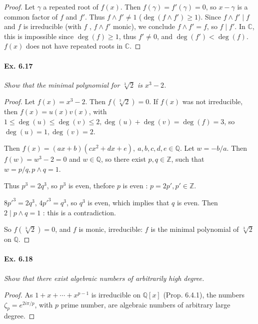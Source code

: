 \documentclass[11pt,a4paper]{article}
\newcommand{\Q}{\mathbb{Q}}
\newcommand{\Z}{\mathbb{Z}}
\newcommand{\C}{\mathbb{C}}
\begin{document}
\begin{proof}
Let $\gamma$ a repeated root of $f(x)$. Then $f(\gamma) = f'(\gamma) = 0$, so $x -\gamma$ is a common factor of $f$ and $f'$. Thus  $f \wedge f' \neq 1$ ($ \deg(f\wedge f') \geq 1)$.
Since $f \wedge f' \mid f$ and $f$ is irreducible (with $f$ , $f\wedge f'$ monic), we conclude $f\wedge f' = f$, so $f \mid f'$. In $\C$, this is impossible since $\deg(f) \geq 1$, thus $f'\neq 0$, and $\deg(f') < \deg(f)$. $f(x)$ does not have repeated roots in $\C$.
\end{proof}

\paragraph{Ex. 6.17}

{\it Show that the minimal polynomial for $\sqrt[3]{2}$ is $x^3 -2$.
}

\begin{proof}
Let $f(x) = x^3-2$. Then $f(\sqrt[3]{2}) = 0$.
If $f(x)$ was not irreducible, then $f(x) = u(x) v(x)$, with $1\leq \deg(u) \leq \deg(v) \leq 2, \deg(u) + \deg(v) = \deg(f) = 3$, so $\deg(u) = 1,\deg(v) = 2$.

Then $f(x) = (ax+b)(cx^2+dx+e), \ a,b,c,d,e \in \Q$.
Let $w = -b/a$. Then $f(w) = w^3 - 2= 0$ and $w\in \Q$, so there exist $p,q\in \Z$, such that $w = p/q, p\wedge q = 1$.

Thus $p^3 = 2 q^3$, so $p^3$ is even, thefore $p$ is even : $p = 2 p', p' \in \Z$.

$8 p'^3 = 2 q^3$, $4p'^3 = q^3$, so $q^3$ is even, which implies that $q$ is even. Then $2 \mid p\wedge q = 1$ : this is a contradiction.

So $f(\sqrt[3]{2}) = 0$, and $f$ is monic, irreducible: $f$ is the minimal polynomial of $\sqrt[3]{2}$ on $\Q$.
\end{proof}

\paragraph{Ex. 6.18}

{\it Show that there exist algebraic numbers of arbitrarily high degree.
}

\begin{proof}
As $1+x+\cdots+x^{p-1}$ is irreducible on $\Q[x]$ (Prop. 6.4.1), the numbers $\zeta_p = e^{2i\pi/p}$, with $p$ prime number, are algebraic numbers of arbitrary large degree.
\end{proof}
\end{document}
